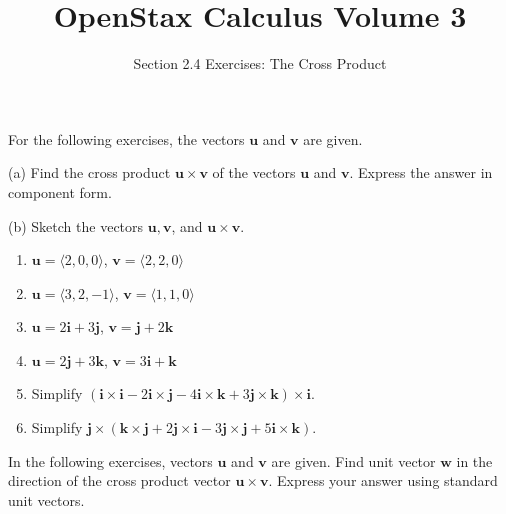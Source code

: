 \documentclass{exercises}
\title{OpenStax Calculus Volume 3}
\subtitle{Section 2.4 Exercises: The Cross Product}
\author{}
\date{}
\begin{document}
\maketitle


For the following exercises, the vectors $\mathbf{u}$ and $\mathbf{v}$ are given.


(a) Find the cross product $\mathbf{u}\times \mathbf{v}$ of the vectors $\mathbf{u}$ and $\mathbf{v}$. Express the answer in component form.


(b) Sketch the vectors $\mathbf{u},\mathbf{v}$, and $\mathbf{u}\times \mathbf{v}$.

\begin{enumerate}[start=1]
\item $\mathbf{u}=\langle2,0,0\rangle$, $\mathbf{v}=\langle2,2,0\rangle$
\item $\mathbf{u}=\langle3,2,-1\rangle$, $\mathbf{v}=\langle1,1,0\rangle$
\item $\mathbf{u}=2\mathbf{i}+3\mathbf{j}$, $\mathbf{v}=\mathbf{j}+2\mathbf{k}$
\item $\mathbf{u}=2\mathbf{j}+3\mathbf{k}$, $\mathbf{v}=3\mathbf{i}+\mathbf{k}$
\item Simplify $(\mathbf{i}\times \mathbf{i}-2\mathbf{i}\times \mathbf{j}-4\mathbf{i}\times \mathbf{k}+3\mathbf{j}\times \mathbf{k})\times \mathbf{i}$.
\item Simplify $\mathbf{j}\times (\mathbf{k}\times \mathbf{j}+2\mathbf{j}\times \mathbf{i}-3\mathbf{j}\times \mathbf{j}+5\mathbf{i}\times \mathbf{k})$.
\end{enumerate}

In the following exercises, vectors $\mathbf{u}$ and $\mathbf{v}$ are given. Find unit vector $\mathbf{w}$ in the direction of the cross product vector $\mathbf{u}\times \mathbf{v}$. Express your answer using standard unit vectors.
\end{document}
